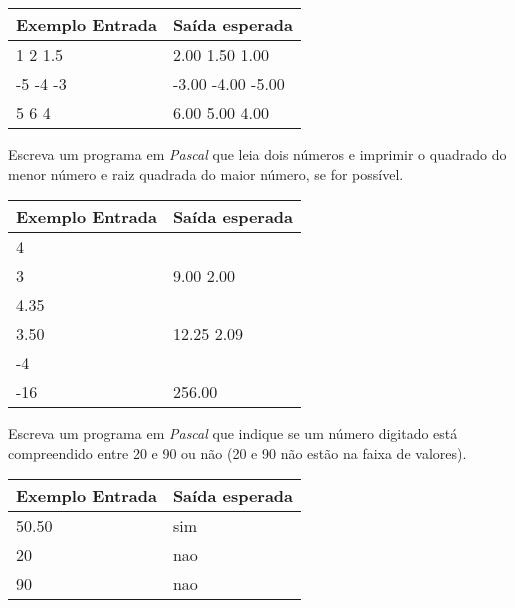 \begin{center}
\begin{tabular}{|l|l|} \hline
Exemplo Entrada & Saída esperada \\ \hline
1 2 1.5                & 2.00 1.50 1.00               \\ \hline
-5 -4 -3                & -3.00 -4.00 -5.00                \\ \hline
5 6 4                & 6.00 5.00 4.00               \\ \hline
\end{tabular}
\end{center}

\item Escreva um programa em \emph{Pascal} que leia dois números e imprimir 
o quadrado do menor número e raiz quadrada do maior número, se for possível.

\begin{center}
\begin{tabular}{|l|l|} \hline
Exemplo Entrada & Saída esperada \\ \hline
4                &                \\
3                & 9.00 2.00               \\ \hline
4.35                &                \\
3.50                & 12.25 2.09              \\ \hline
-4                &                \\ 
-16                & 256.00               \\ \hline
\end{tabular}
\end{center}

\item Escreva um programa em \emph{Pascal} que indique se um número digitado 
está compreendido entre 20 e 90 ou não (20 e 90 não estão na faixa de valores).

\begin{center}
\begin{tabular}{|l|l|} \hline
Exemplo Entrada & Saída esperada \\ \hline
50.50                & sim               \\ \hline
20                & nao               \\ \hline
90                & nao               \\ \hline
\end{tabular}
\end{center}

